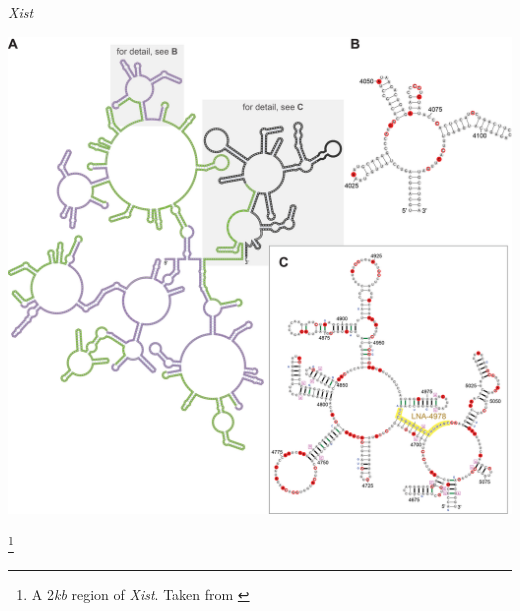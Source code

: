 \documentclass[aspectratio=169,11pt]{beamer}
\newcommand\blfootnote[1]{%
  \begingroup
  \renewcommand\thefootnote{}\footnote{#1}%
  \addtocounter{footnote}{-1}%
  \endgroup
}
\begin{document}
\begin{frame}{\textit{Xist}}

	\begin{center}
	\includegraphics[scale=0.35]{figures/Xist.png} 
	\end{center}
	
\blfootnote{A 2\textit{kb} region of \textit{Xist}. Taken from \cite{plosXist}}	
	
\end{frame}
\end{document}

